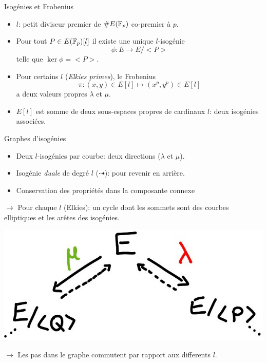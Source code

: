 \documentclass{beamer}
\begin{document}
\begin{frame}{Isog\'enies et Frobenius}
	\begin{itemize}
		\item  $l$: petit diviseur premier de $\#E(\mathbb{F}_p)$ co-premier \`a $p$.
		\item Pour  tout $P\in E(\mathbb{F}_p)[l]$ il existe une unique $l$-isog\'enie
	\[
		\phi: E\rightarrow E/<P>
	\]
	telle que $\ker\phi = <P>$.
\item Pour certains $l$ (\textit{Elkies primes}), le Frobenius
		\[
			\pi: (x, y)\in E[l]\mapsto (x^p, y^p)\in E[l]
		\]
	a deux valeurs propres $\lambda$ et $\mu$.
\item $E[l]$ est somme de deux sous-espaces propres de cardinaux $l$: deux isog\'enies associ\'ees.
	\end{itemize}
\end{frame}

\begin{frame}{Graphes d'isog\'enies}
	\begin{itemize}
		\item Deux $l$-isog\'enies par courbe: deux directions ($\lambda$ et $\mu$).
		\item Isog\'enie \textit{duale} de degr\'e $l$ ($\dashrightarrow$): pour revenir en arri\`ere.
		\item Conservation des propri\'et\'es dans la composante connexe
	\end{itemize}
	 \vspace*{0.2cm}
	$\rightarrow$ Pour chaque $l$ (Elkies): un cycle dont les sommets sont des courbes elliptiques et les ar\^etes des isog\'enies.
	 \vspace*{0.2cm}
	\begin{center}
		\includegraphics[scale=0.2]{../figs/Cycle}
	\end{center}
	$\rightarrow$ Les pas dans le graphe commutent par rapport aux differents $l$.
\end{frame}
\end{document}
